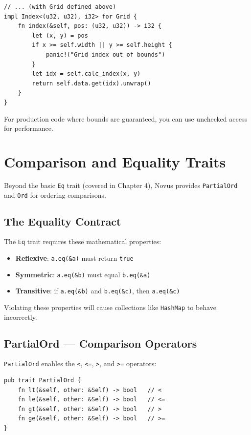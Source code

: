 \begin{lstlisting}
// ... (with Grid defined above)
impl Index<(u32, u32), i32> for Grid {
    fn index(&self, pos: (u32, u32)) -> i32 {
        let (x, y) = pos
        if x >= self.width || y >= self.height {
            panic!("Grid index out of bounds")
        }
        let idx = self.calc_index(x, y)
        return self.data.get(idx).unwrap()
    }
}
\end{lstlisting}

For production code where bounds are guaranteed, you can use unchecked access for performance.


\section{Comparison and Equality Traits}
\label{sec:comparison-traits}

Beyond the basic \texttt{Eq} trait (covered in Chapter 4), Novus provides \texttt{PartialOrd} and \texttt{Ord} for ordering comparisons.

\subsection{The Equality Contract}

The \texttt{Eq} trait requires these mathematical properties:

\begin{itemize}
    \item \textbf{Reflexive}: \texttt{a.eq(\&a)} must return \texttt{true}
    \item \textbf{Symmetric}: \texttt{a.eq(\&b)} must equal \texttt{b.eq(\&a)}
    \item \textbf{Transitive}: if \texttt{a.eq(\&b)} and \texttt{b.eq(\&c)}, then \texttt{a.eq(\&c)}
\end{itemize}

Violating these properties will cause collections like \texttt{HashMap} to behave incorrectly.

\subsection{PartialOrd --- Comparison Operators}

\texttt{PartialOrd} enables the \texttt{<}, \texttt{<=}, \texttt{>}, and \texttt{>=} operators:

\begin{lstlisting}
pub trait PartialOrd {
    fn lt(&self, other: &Self) -> bool   // <
    fn le(&self, other: &Self) -> bool   // <=
    fn gt(&self, other: &Self) -> bool   // >
    fn ge(&self, other: &Self) -> bool   // >=
}
\end{lstlisting}

